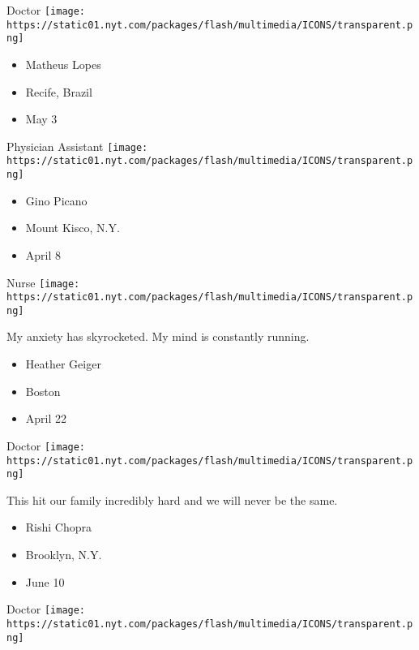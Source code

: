 \protect\hyperlink{item-matheus-lopes}{}

Doctor
\texttt{[image: https://static01.nyt.com/packages/flash/multimedia/ICONS/transparent.png]}

\begin{itemize}
\tightlist
\item
  Matheus Lopes
\item
  Recife, Brazil
\item
  May 3
\end{itemize}

\protect\hyperlink{item-gino-picano}{}

Physician Assistant
\texttt{[image: https://static01.nyt.com/packages/flash/multimedia/ICONS/transparent.png]}

\begin{itemize}
\tightlist
\item
  Gino Picano
\item
  Mount Kisco, N.Y.
\item
  April 8
\end{itemize}

\protect\hyperlink{item-heather-geiger}{}

Nurse
\texttt{[image: https://static01.nyt.com/packages/flash/multimedia/ICONS/transparent.png]}

My anxiety has skyrocketed. My mind is constantly running.

\begin{itemize}
\tightlist
\item
  Heather Geiger
\item
  Boston
\item
  April 22
\end{itemize}

\protect\hyperlink{item-rishi-chopra}{}

Doctor
\texttt{[image: https://static01.nyt.com/packages/flash/multimedia/ICONS/transparent.png]}

This hit our family incredibly hard and we will never be the same.

\begin{itemize}
\tightlist
\item
  Rishi Chopra
\item
  Brooklyn, N.Y.
\item
  June 10
\end{itemize}

\protect\hyperlink{item-claudine-aguilera}{}

Doctor
\texttt{[image: https://static01.nyt.com/packages/flash/multimedia/ICONS/transparent.png]}

